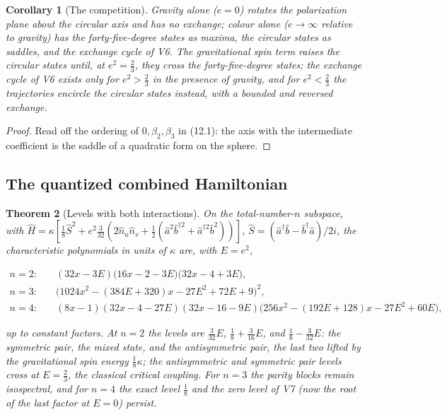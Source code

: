 \documentclass[11pt]{article}
\newtheorem{theorem}{Theorem}[section]
\newtheorem{corollary}[theorem]{Corollary}
\theoremstyle{remark}
\begin{document}
\begin{corollary}[The competition]
\label{cor:v20v9-competition}
Gravity alone (\(e=0\)) rotates the polarization plane about the
circular axis and has no exchange; colour alone (\(e\to\infty\)
relative to gravity) has the forty-five-degree states as maxima, the
circular states as saddles, and the exchange cycle of V6.  The
gravitational spin term raises the circular states until, at
\(e^2=\tfrac23\), they cross the forty-five-degree states; the exchange
cycle of V6 exists only for \(e^2>\tfrac23\) in the presence of gravity,
and for \(e^2<\tfrac23\) the trajectories encircle the circular states
instead, with a bounded and reversed exchange.
\end{corollary}

\begin{proof}
Read off the ordering of \(0,\beta_2,\beta_3\) in (12.1): the axis
with the intermediate coefficient is the saddle of a quadratic form on
the sphere.
\end{proof}

\subsection{The quantized combined Hamiltonian}

\begin{theorem}[Levels with both interactions]
\label{thm:v20v9-levels}
On the total-number-\(n\) subspace, with
\(\widehat H=\kappa[\tfrac18\widehat S^2+e^2\tfrac3{32}(2\hat n_u\hat n_v+\tfrac12(\hat a^2\hat b^{\dagger2}+\hat a^{\dagger2}\hat b^2))]\),
\(\widehat S=(\hat a^\dagger\hat b-\hat b^\dagger\hat a)/2i\), the
characteristic polynomials in units of \(\kappa\) are, with \(E=e^2\),

\[
\begin{aligned}
 n=2:&\quad (32x-3E)\bigl(16x-2-3E\bigr)\bigl(32x-4+3E\bigr),\\
 n=3:&\quad \bigl(1024x^2-(384E+320)x-27E^2+72E+9\bigr)^2,\\
 n=4:&\quad (8x-1)(32x-4-27E)(32x-16-9E)\bigl(256x^2-(192E+128)x-27E^2+60E\bigr),
\end{aligned}                                                          \tag{12.4}
\]

up to constant factors.  At \(n=2\) the levels are \(\tfrac3{32}E\),
\(\tfrac18+\tfrac3{16}E\), and \(\tfrac18-\tfrac3{32}E\): the symmetric
pair, the mixed state, and the antisymmetric pair, the last two
lifted by the gravitational spin energy \(\tfrac18\kappa\); the
antisymmetric and symmetric pair levels cross at \(E=\tfrac23\), the
classical critical coupling.  For \(n=3\) the parity blocks remain
isospectral, and for \(n=4\) the exact level \(\tfrac18\) and the zero
level of V7 (now the root of the last factor at \(E=0\)) persist.
\end{theorem}
\end{document}
